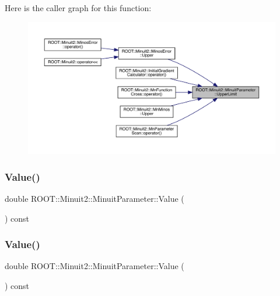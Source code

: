 Here is the caller graph for this function\+:
\nopagebreak
\begin{figure}[H]
\begin{center}
\leavevmode
\includegraphics[width=350pt]{dd/dfb/classROOT_1_1Minuit2_1_1MinuitParameter_a285e254a9574807222d2a74bb05e18d9_icgraph}
\end{center}
\end{figure}
\mbox{\label{classROOT_1_1Minuit2_1_1MinuitParameter_ac77aed82006ba9e9598df49a1753d31c}} 
\subsubsection{\texorpdfstring{Value()}{Value()}\hspace{0.1cm}{\footnotesize\ttfamily [1/3]}}
{\footnotesize\ttfamily double R\+O\+O\+T\+::\+Minuit2\+::\+Minuit\+Parameter\+::\+Value (\begin{DoxyParamCaption}{ }\end{DoxyParamCaption}) const\hspace{0.3cm}{\ttfamily [inline]}}

\mbox{\label{classROOT_1_1Minuit2_1_1MinuitParameter_ac77aed82006ba9e9598df49a1753d31c}} 
\subsubsection{\texorpdfstring{Value()}{Value()}\hspace{0.1cm}{\footnotesize\ttfamily [2/3]}}
{\footnotesize\ttfamily double R\+O\+O\+T\+::\+Minuit2\+::\+Minuit\+Parameter\+::\+Value (\begin{DoxyParamCaption}{ }\end{DoxyParamCaption}) const\hspace{0.3cm}{\ttfamily [inline]}}


